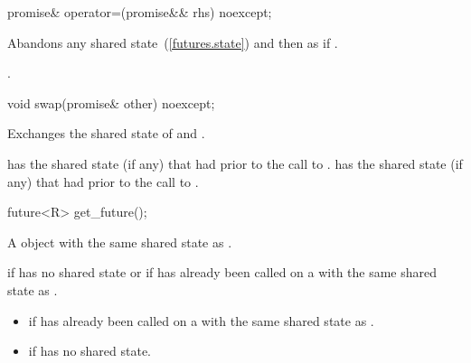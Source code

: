 %
%
\begin{itemdecl}
promise& operator=(promise&& rhs) noexcept;
\end{itemdecl}

\begin{itemdescr}
\pnum
\effects
Abandons any shared state~(\ref{futures.state}) and then as if
.

\pnum
\returns {}.
\end{itemdescr}

%
%
\begin{itemdecl}
void swap(promise& other) noexcept;
\end{itemdecl}

\begin{itemdescr}
\pnum
\effects Exchanges the shared state of  and .

\pnum
\postcondition {} has the shared state (if any) that  had
prior to the call to .  has the shared state (if any) that
 had prior to the call to .
\end{itemdescr}

%
%
\begin{itemdecl}
future<R> get_future();
\end{itemdecl}

\begin{itemdescr}
\pnum
\returns A  object with the same shared state as
.

\pnum
\throws {} if  has no shared state or if
 has already been called on a  with the same
shared state as .

\pnum
\errors

\begin{itemize}
\item {} if  has already been called on
a  with the same shared state as .

\item {} if  has no shared state.
\end{itemize}
\end{itemdescr}

